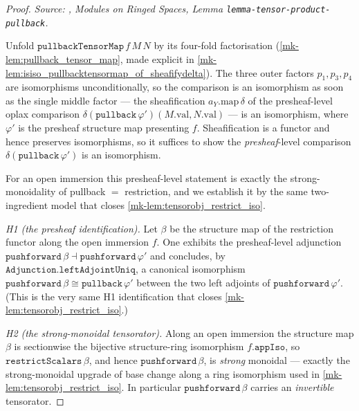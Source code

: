 \begin{proof}
  \textit{Source: \cite{stacks-project}, Modules on Ringed Spaces, Lemma
  \texttt{lemma-tensor-product-pullback}.}

  Unfold \(\mathtt{pullbackTensorMap}\,f\,M\,N\) by its four-fold factorisation
  (\ref{mk-lem:pullback_tensor_map}, made explicit in
  \ref{mk-lem:isiso_pullbacktensormap_of_sheafifydelta}). The three outer factors
  \(p_1, p_3, p_4\) are isomorphisms unconditionally, so the comparison is an isomorphism as
  soon as the single middle factor --- the sheafification \(a_Y.\mathrm{map}\,\delta\) of the
  presheaf-level oplax comparison
  \(\delta(\mathtt{pullback}\,\varphi')(M.\mathrm{val}, N.\mathrm{val})\) --- is an
  isomorphism, where \(\varphi'\) is the presheaf structure map presenting \(f\).
  Sheafification is a functor and hence preserves isomorphisms, so it suffices to show the
  \emph{presheaf}-level comparison \(\delta(\mathtt{pullback}\,\varphi')\) is an isomorphism.

  For an open immersion this presheaf-level statement is exactly the strong-monoidality of
  pullback \(=\) restriction, and we establish it by the same two-ingredient model that
  closes \ref{mk-lem:tensorobj_restrict_iso}.

  \emph{H1 (the presheaf identification).} Let \(\beta\) be the structure map of the
  restriction functor along the open immersion \(f\). One exhibits the presheaf-level
  adjunction \(\mathtt{pushforward}\,\beta \dashv \mathtt{pushforward}\,\varphi'\) and
  concludes, by \(\mathtt{Adjunction.leftAdjointUniq}\), a canonical isomorphism
  \(\mathtt{pushforward}\,\beta \cong \mathtt{pullback}\,\varphi'\) between the two left
  adjoints of \(\mathtt{pushforward}\,\varphi'\). (This is the very same H1 identification
  that closes \ref{mk-lem:tensorobj_restrict_iso}.)

  \emph{H2 (the strong-monoidal tensorator).} Along an open immersion the structure map
  \(\beta\) is sectionwise the bijective structure-ring isomorphism \(f.\mathtt{appIso}\), so
  \(\mathtt{restrictScalars}\,\beta\), and hence \(\mathtt{pushforward}\,\beta\), is
  \emph{strong} monoidal --- exactly the strong-monoidal upgrade of base change along a ring
  isomorphism used in \ref{mk-lem:tensorobj_restrict_iso}. In particular
  \(\mathtt{pushforward}\,\beta\) carries an \emph{invertible} tensorator.


\end{proof}
